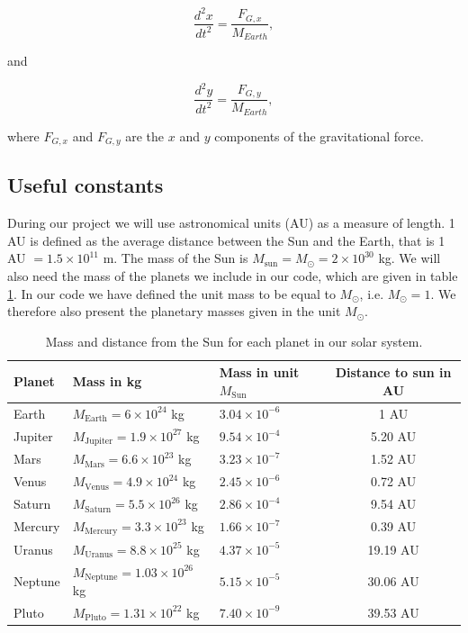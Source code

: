 \documentclass[a4paper, fontsize=11pt]{article}
\begin{document}
\begin{equation}
\dfrac{d^2x}{dt^2}=\dfrac{F_{G,x}}{M_{Earth}},
\end{equation}

and 

\begin{equation}
\dfrac{d^2y}{dt^2}=\dfrac{F_{G,y}}{M_{Earth}},
\end{equation}

where $F_{G,x}$ and $F_{G,y}$ are the $x$ and $y$ components of the gravitational force.


\subsection{Useful constants}
During our project we will use astronomical units (AU) as a measure of length. 1 AU is defined as the average distance between the Sun and the Earth, that is 1 AU $= 1.5 \times 10^{11}$ m. The mass of the Sun is $M_{\text{sun}}=M_{\odot}=2 \times 10^{30}$ kg. We will also need the mass of the planets we include in our code, which are given in table \ref{PlanetMass}. In our code we have defined the unit mass to be equal to $M_{\odot}$, i.e. $M_{\odot}=1$. We therefore also present the planetary masses given in the unit $M_{\odot}$.

\begin{table}[H]
\begin{center}
\caption{Mass and distance from the Sun for each planet in our solar system.}
\begin{tabular}{l l l c}
\toprule
Planet & Mass in kg & Mass in unit $M_{\text{Sun}}$ & Distance to sun in AU \\ \midrule
Earth    &    $M_{\text{Earth}}=6 \times 10^{24} $ kg & $3.04 \times 10^{-6}$ &    1 AU\\
Jupiter    &    $M_{\text{Jupiter}}=1.9 \times 10^{27} $ kg & $9.54 \times 10^{-4}$ &   5.20 AU\\
Mars    &    $M_{\text{Mars}}=6.6 \times 10^{23} $ kg &  $3.23 \times 10^{-7}$  & 1.52 AU\\
Venus    &    $M_{\text{Venus}}=4.9 \times 10^{24} $ kg &  $2.45 \times 10^{-6}$  &  0.72 AU\\
Saturn    &    $M_{\text{Saturn}}=5.5 \times 10^{26} $ kg &  $2.86 \times 10^{-4}$  &  9.54 AU\\
Mercury    &    $M_{\text{Mercury}}=3.3 \times 10^{23} $ kg &  $1.66 \times 10^{-7}$ &   0.39 AU\\
Uranus    &    $M_{\text{Uranus}}=8.8 \times 10^{25} $ kg &  $4.37 \times 10^{-5}$ &   19.19 AU\\
Neptune    &    $M_{\text{Neptune}}=1.03 \times 10^{26} $ kg &  $5.15 \times 10^{-5}$  & 30.06 AU\\
Pluto    &    $M_{\text{Pluto}}=1.31 \times 10^{22} $ kg &  $7.40 \times 10^{-9}$ &   39.53 AU\\
\bottomrule
\end{tabular}
\label{PlanetMass}
\end{center}
\end{table}
\end{document}
